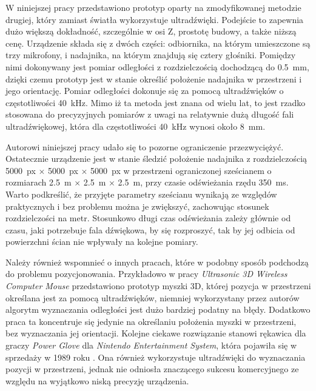  W niniejszej pracy przedstawiono prototyp oparty na zmodyfikowanej metodzie drugiej, który zamiast światła wykorzystuje ultradźwięki. 
 Podejście to zapewnia dużo większą dokładność, szczególnie w osi Z, prostotę budowy, a także niższą cenę.
 Urządzenie składa się z dwóch części: odbiornika, na którym umieszczone są trzy mikrofony, i nadajnika,
 na którym znajdują się cztery głośniki. Pomiędzy nimi dokonywany jest pomiar odległości z rozdzielczością
 dochodzącą do \SI{0,5}{mm}, dzięki czemu prototyp jest w stanie określić położenie nadajnika
w przestrzeni i jego orientację. 
Pomiar odległości dokonuje się za pomocą ultradźwięków o częstotliwości \SI{40}{kHz}.
Mimo iż ta metoda jest znana od wielu lat, to jest  rzadko stosowana do precyzyjnych pomiarów
z uwagi na relatywnie dużą długość fali ultradźwiękowej,
która dla częstotliwości \SI{40}{kHz} wynosi około \SI{8}{mm}.

Autorowi niniejszej pracy udało się to pozorne ograniczenie przezwyciężyć.
Ostatecznie urządzenie jest w stanie śledzić położenie nadajnika z rozdzielczością 
\SI{5000}{px} $\times$ \SI{5000}{px} $\times$ \SI{5000}{px} w przestrzeni ograniczonej sześcianem o rozmiarach 
\SI{2,5}{m} $\times$ \SI{2,5}{m}  $\times$ \SI{2,5}{m}, przy czasie odświeżania rzędu \SI{350}{ms}.
Warto podkreślić, że przyjęte parametry sześcianu wynikają ze względów praktycznych i bez 
problemu można je zwiększyć, zachowując stosunek rozdzielczości na metr.
Stosunkowo długi czas odświeżania zależy głównie od czasu,  
 jaki potrzebuje fala dźwiękowa, by się rozproszyć,
 tak by jej odbicia od powierzchni ścian nie wpływały na kolejne pomiary.

Należy również wspomnieć o innych pracach, które w podobny sposób podchodzą do problemu pozycjonowania. Przykładowo 
w pracy \textit{Ultrasonic 3D Wireless Computer Mouse} \cite{bib:mouse} przedstawiono prototyp myszki 3D, której
pozycja w przestrzeni określana jest za pomocą ultradźwięków, niemniej wykorzystany przez autorów algorytm wyznaczania 
odległości jest dużo bardziej podatny na błędy. Dodatkowo praca ta koncentruje się jedynie
na określaniu położenia myszki w przestrzeni, bez wyznaczania jej orientacji.
Kolejne ciekawe rozwiązanie stanowi rękawica dla graczy 
\textit{Power Glove} \cite{bib:powerGlove} dla
\textit{Nintendo Entertainment System}, która pojawiła się w sprzedaży w  1989 roku \cite{bib:powerGlove2}. 
Ona również wykorzystuje ultradźwięki do wyznaczania pozycji
w przestrzeni, jednak nie odniosła  znaczącego sukcesu komercyjnego ze względu na wyjątkowo niską precyzję urządzenia.


